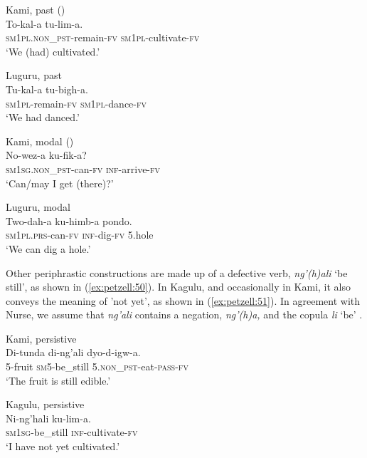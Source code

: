 \documentclass[output=paper,
            colorlinks, citecolor=brown
            ,draftmode
		  ]{langscibook}
\begin{document}
\ex\label{ex:petzell:46}Kami, past (\citealt[583]{PetzellAunio2019})\\
\gll To-kal-a               tu-lim-a.  \\
\textsc{sm}1\textsc{pl}.\textsc{non\_pst}{}-remain-\textsc{fv}    \textsc{sm}1\textsc{pl}{}-cultivate-\textsc{fv}\\
\glt `We (had) cultivated.'


\ex\label{ex:petzell:47}Luguru, past\\
\gll Tu-kal-a           tu-bigh-a. \\
\textsc{sm}1\textsc{pl}{}-remain-\textsc{fv}      \textsc{sm}1\textsc{pl}{}-dance-\textsc{fv}\\
\glt `We had danced.'


\ex\label{ex:petzell:48}Kami, modal (\citealt[584]{PetzellAunio2019})\\
\gll No-wez-a             ku-fik-a?  \\
\textsc{sm}1\textsc{sg}.\textsc{non\_pst}{}-can-\textsc{fv}     \textsc{inf}{}-arrive-\textsc{fv}\\
\glt `Can/may I get (there)?'


\ex\label{ex:petzell:49}Luguru, modal\\
\gll Two-dah-a         ku-himb-a  pondo. \\
\textsc{sm}1\textsc{pl}.\textsc{prs}{}-can-\textsc{fv}    \textsc{inf}{}-dig-\textsc{fv} 5.hole\\
\glt `We can dig a hole.'
\z


Other periphrastic constructions are made up of a defective verb, \textit{ng'(h)ali} {}`be still', as shown in  (\ref{ex:petzell:50}). In Kagulu, and occasionally in Kami, it also conveys the meaning of 'not yet', as shown in  (\ref{ex:petzell:51}). In agreement with Nurse, we assume that \textit{ng'ali} contains a negation, \textit{ng'(h)a,} and the copula \textit{li} `be' \citep[173]{Nurse2008}.


\ea\label{ex:petzell:50}Kami, persistive\\
\gll Di-tunda   di-ng'ali       dyo-d-igw-a. \\
5-fruit     \textsc{sm}{5}{}-be\_still     5.\textsc{non\_pst}{}-eat-\textsc{pass}{}-\textsc{fv}\\
\glt `The fruit is still edible.'


\ex\label{ex:petzell:51}Kagulu, persistive\\
\gll Ni-ng'hali         ku-lim-a. \\
\textsc{sm}1\textsc{sg}{}-be\_still \textsc{inf}{}-cultivate-\textsc{fv} \\
\glt `I have not yet cultivated.'
\z
\end{document}
